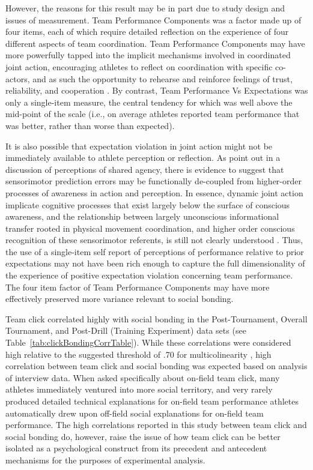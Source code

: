 However, the reasons for this result may be in part due to study design and issues of measurement.  Team Performance Components was a factor made up of four items, each of which require detailed reflection on the experience of four different aspects of team coordination.  Team Performance Components may have more powerfully tapped into the implicit mechanisms involved in coordinated joint action, encouraging athletes to reflect on coordination with specific co-actors, and as such the opportunity to rehearse and reinforce feelings of trust, reliability, and cooperation \citep{Reddish2013a}.  By contrast, Team Performance Vs Expectations was only a single-item measure, the central tendency for which was well above the mid-point of the scale (i.e., on average athletes reported team performance that was better, rather than worse than expected).

It is also possible that expectation violation in joint action might not be immediately available to athlete perception or reflection.  As \textcite[1277]{VanderWel2012} point out in a discussion of perceptions of shared agency, there is evidence to suggest that sensorimotor prediction errors may be functionally de-coupled from higher-order processes of awareness in action and perception.  In essence, dynamic joint action implicate cognitive processes that exist largely below the surface of conscious awareness, and the relationship between largely unconscious informational transfer rooted in physical movement coordination, and higher order conscious recognition of these sensorimotor referents, is still not clearly understood \citep{Semin2008,Frith2007,Frith2010,Clark2013}.  Thus, the use of a single-item self report of perceptions of performance relative to prior expectations may not have been rich enough to capture the full dimensionality of the experience of positive expectation violation concerning team performance.  The four item factor of Team Performance Components may have more effectively preserved more variance relevant to social bonding.

 Team click correlated highly with social bonding in the Post-Tournament, Overall Tournament, and Post-Drill (Training Experiment) data sets (see Table~\ref{tab:clickBondingCorrTable}).  While these correlations were considered high relative to the suggested threshold of .70 for multicolinearity \citep{Field2012}, high correlation between team click and social bonding was expected based on analysis of interview data.  When asked specifically about on-field team click, many athletes immediately ventured into more social territory, and very rarely produced detailed technical explanations for   on-field team performance  athletes automatically drew upon off-field social explanations for on-field team performance.  The high correlations reported in this study between team click and social bonding do, however, raise the issue of how team click can be better isolated as a psychological construct from its precedent and antecedent mechanisms for the purposes of experimental analysis.

